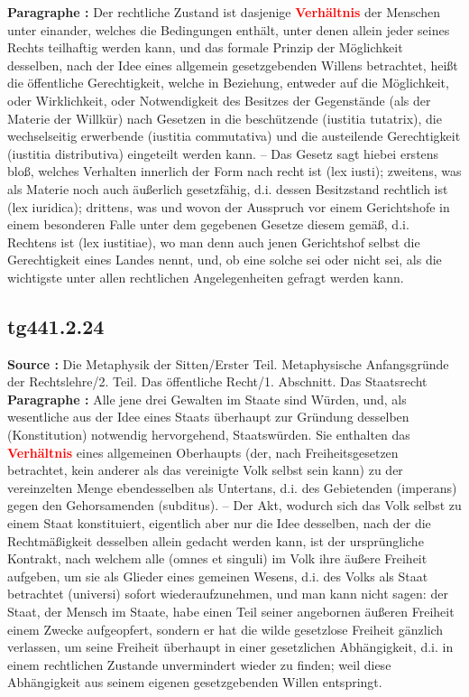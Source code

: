 \documentclass[a4paper,12pt,twoside]{book}
\newcommand{\match}[1]{\textcolor{red}{\textbf{#1}}}
\begin{document}
	\textbf{Paragraphe : }Der rechtliche Zustand ist dasjenige \match{Verhältnis} der Menschen unter einander, welches die Bedingungen enthält,  unter denen allein jeder seines Rechts teilhaftig werden kann, und das formale Prinzip der Möglichkeit desselben, nach der Idee eines allgemein gesetzgebenden Willens betrachtet, heißt die öffentliche Gerechtigkeit, welche in Beziehung, entweder auf die Möglichkeit, oder Wirklichkeit, oder Notwendigkeit des Besitzes der Gegenstände (als der Materie der Willkür) nach Gesetzen in die beschützende (iustitia tutatrix), die wechselseitig erwerbende (iustitia commutativa) und die austeilende Gerechtigkeit (iustitia distributiva) eingeteilt werden kann. – Das Gesetz sagt hiebei erstens bloß, welches Verhalten innerlich der Form nach recht ist (lex iusti); zweitens, was als Materie noch auch äußerlich gesetzfähig, d.i. dessen Besitzstand rechtlich ist (lex iuridica); drittens, was und wovon der Ausspruch vor einem Gerichtshofe in einem besonderen Falle unter dem gegebenen Gesetze diesem gemäß, d.i. Rechtens ist (lex iustitiae), wo man denn auch jenen Gerichtshof selbst die Gerechtigkeit eines Landes nennt, und, ob eine solche sei oder nicht sei, als die wichtigste unter allen rechtlichen Angelegenheiten gefragt werden kann. 
	
	\subsection*{tg441.2.24} 
	\textbf{Source : }Die Metaphysik der Sitten/Erster Teil. Metaphysische Anfangsgründe der Rechtslehre/2. Teil. Das öffentliche Recht/1. Abschnitt. Das Staatsrecht\\  
	
	\textbf{Paragraphe : }Alle jene drei Gewalten im Staate sind Würden, und, als wesentliche aus der Idee eines Staats überhaupt zur Gründung desselben (Konstitution) notwendig hervorgehend, Staatswürden. Sie enthalten das \match{Verhältnis} eines allgemeinen Oberhaupts (der, nach Freiheitsgesetzen betrachtet, kein anderer als das vereinigte Volk selbst sein kann) zu der vereinzelten Menge ebendesselben als Untertans, d.i. des Gebietenden (imperans) gegen den Gehorsamenden (subditus). – Der Akt, wodurch sich das Volk selbst zu einem Staat konstituiert, eigentlich aber nur die Idee desselben, nach der die Rechtmäßigkeit desselben allein gedacht werden kann, ist der ursprüngliche Kontrakt, nach welchem alle (omnes et singuli) im Volk ihre äußere Freiheit aufgeben, um sie als Glieder eines gemeinen Wesens, d.i. des Volks als Staat betrachtet (universi) sofort wiederaufzunehmen, und man kann nicht sagen: der Staat, der Mensch im Staate, habe einen Teil seiner angebornen äußeren Freiheit einem Zwecke aufgeopfert, sondern er hat die wilde gesetzlose Freiheit gänzlich verlassen, um seine Freiheit überhaupt in einer gesetzlichen Abhängigkeit, d.i. in einem rechtlichen Zustande unvermindert wieder zu finden; weil diese Abhängigkeit aus seinem eigenen gesetzgebenden Willen entspringt. 
	
\end{document}
